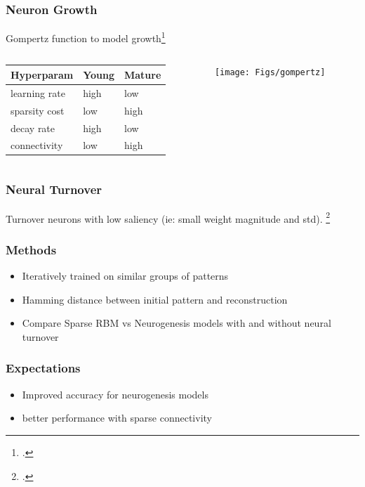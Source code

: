 \documentclass{beamer}
\begin{document}
\begin{frame}
\frametitle{Neuron Growth}
Gompertz function to model growth\footcite{gompertz}
\begin{columns}[T]
\begin{column}[T]{.55\linewidth}
\begin{table}[h]
\center
\begin{tabular}{l l l}
\toprule
\textbf{Hyperparam} & \textbf{Young} & \textbf{Mature} \\
\midrule
learning rate & high & low \\
sparsity cost & low & high \\
decay rate & high & low \\
connectivity & low & high \\
\bottomrule
\end{tabular}
\end{table}
\end{column}
\begin{column}[T]{.4\linewidth} %
\texttt{[image: Figs/gompertz]}
\end{column}
\end{columns}
\end{frame}

\begin{frame}
\frametitle{Neural Turnover}
Turnover neurons with low saliency (ie: small weight magnitude and std). \footcite{apoptosis-review}
\end{frame}

\begin{frame}
\frametitle{Methods}
\begin{itemize}
\item Iteratively trained on similar groups of patterns
\item Hamming distance between initial pattern and reconstruction
\item Compare Sparse RBM vs Neurogenesis models with and without neural turnover
\end{itemize}
\end{frame}

\begin{frame}
\frametitle{Expectations}
\begin{itemize}
\item Improved accuracy for neurogenesis models
\item better performance with sparse connectivity
\end{itemize}
\end{frame}
\end{document}
